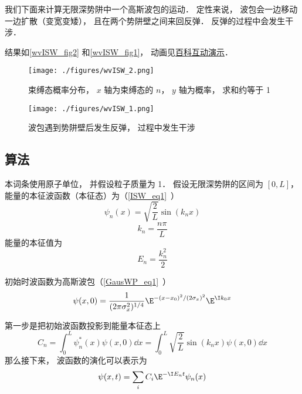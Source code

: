 

我们下面来计算无限深势阱中一个高斯波包的运动． 定性来说， 波包会一边移动一边扩散（变宽变矮）， 且在两个势阱壁之间来回反弹． 反弹的过程中会发生干涉．

结果如\autoref{wvISW_fig2} 和\autoref{wvISW_fig1}， 动画见\href{http://wuli.wiki/apps/wvISW.html}{百科互动演示}．

\begin{figure}[ht]
\centering
\texttt{[image: ./figures/wvISW\_2.png]}
\caption{束缚态概率分布， $x$ 轴为束缚态的 $n$， $y$ 轴为概率， 求和约等于 1} \label{wvISW_fig2}
\end{figure}

\begin{figure}[ht]
\centering
\texttt{[image: ./figures/wvISW\_1.png]}
\caption{波包遇到势阱壁后发生反弹， 过程中发生干涉} \label{wvISW_fig1}
\end{figure}

\subsection{算法}

本词条使用原子单位， 并假设粒子质量为 1． 假设无限深势阱的区间为 $[0, L]$， 能量的本征波函数（本征态）为（\autoref{ISW_eq1}~）
\begin{equation}
\psi _n(x) = \sqrt{\frac{2}{L}} \sin(k_n x)
\end{equation}
\begin{equation}
k_n = \frac{n\pi }{L}
\end{equation}
能量的本征值为
\begin{equation}
E_n = \frac{k_n^2}{2}
\end{equation}

初始时波函数为高斯波包（\autoref{GausWP_eq1}~）
\begin{equation}
\psi (x,0) = \frac{1}{(2\pi \sigma _x ^2)^{1/4}} \E^{-(x - x_0)^2/(2\sigma _x)^2} \E^{\I k_0x}
\end{equation}

第一步是把初始波函数投影到能量本征态上
\begin{equation}\label{wvISW_eq1}
C_n = \int_0^L \psi _n^*(x) \psi (x,0) \dd{x}
= \int_0^L \sqrt{\frac{2}{L}} \sin(k_n x) \psi (x,0) \dd{x}
\end{equation}
那么接下来， 波函数的演化可以表示为
\begin{equation}\label{wvISW_eq2}
\psi (x,t) = \sum _i C_i \E^{-\I E_n t} \psi _n(x)
\end{equation}

